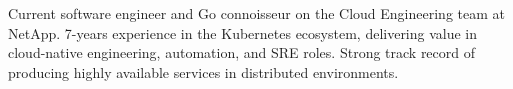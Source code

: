 

\begin{cvparagraph}

Current software engineer and Go connoisseur on the Cloud Engineering team at NetApp. 
7-years experience in the Kubernetes ecosystem, delivering value in cloud-native engineering, automation, and SRE roles. 
Strong track record of producing highly available services in distributed environments. 

\end{cvparagraph}
